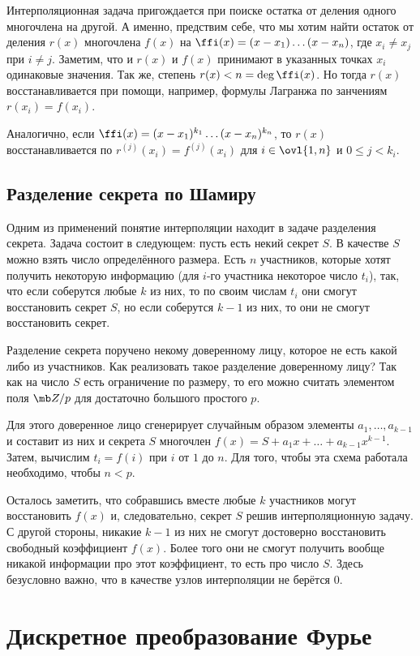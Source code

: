 Интерполяционная задача пригождается при поиске остатка от деления одного многочлена на другой. А именно, предствим себе, что мы хотим найти остаток от деления $r(x)$ многочлена $f(x)$ на $\ffi(x)=(x-x_1)\dots (x-x_n)$, где $x_i\neq x_j$ при $i\neq j$. 
Заметим, что и $r(x)$ и $f(x)$ принимают в указанных точках $x_i$ одинаковые значения. Так же, степень $r(x)< n=\deg \ffi(x)$. Но тогда $r(x)$ восстанавливается при помощи, например, формулы Лагранжа по занчениям $r(x_i)=f(x_i)$.

Аналогично, если $\ffi(x)=(x-x_1)^{k_1}\dots (x-x_n)^{k_n}$, то $r(x)$ восстанавливается по $r^{(j)}(x_i)=f^{(j)}(x_i)$ для $i\in \ovl{1,n}$ и $0\leq j < k_i$.

\subsection{Разделение секрета по Шамиру}
Одним из применений понятие интерполяции находит в задаче разделения секрета. Задача состоит в следующем: пусть есть некий секрет $S$. В качестве $S$ можно взять число определённого размера. Есть $n$ участников, которые хотят получить некоторую информацию (для $i$-го участника некоторое число  $t_i$), так, что если соберутся любые $k$ из них, то по своим числам $t_i$ они смогут восстановить секрет $S$, но если соберутся $k-1$ из них, то они не смогут восстановить секрет.

Разделение секрета поручено некому доверенному лицу, которое не есть какой либо из участников. Как реализовать такое разделение доверенному лицу? Так как на число $S$ есть ограничение по размеру, то его можно считать элементом поля $\mb Z/p$ для достаточно большого простого $p$.

Для этого доверенное лицо сгенерирует случайным образом элементы $a_1,\dots,a_{k-1}$ и составит из них и секрета $S$ многочлен $f(x)=S+a_1x+
\dots+a_{k-1}x^{k-1}$. Затем, вычислим $t_i=f(i)$ при $i$ от $1$ до $n$. Для того, чтобы эта схема работала необходимо, чтобы $n<p$.

Осталось заметить, что собравшись вместе любые $k$ участников могут восстановить  $f(x)$
и, следовательно, секрет $S$ решив интерполяционную задачу. С другой стороны, никакие $k-1$ из них не смогут достоверно восстановить свободный коэффициент $f(x)$. Более того они не смогут получить вообще никакой информации про этот коэффициент, то есть про число $S$. Здесь безусловно важно, что в качестве узлов интерполяции не берётся 0.


\section{Дискретное преобразование Фурье}

